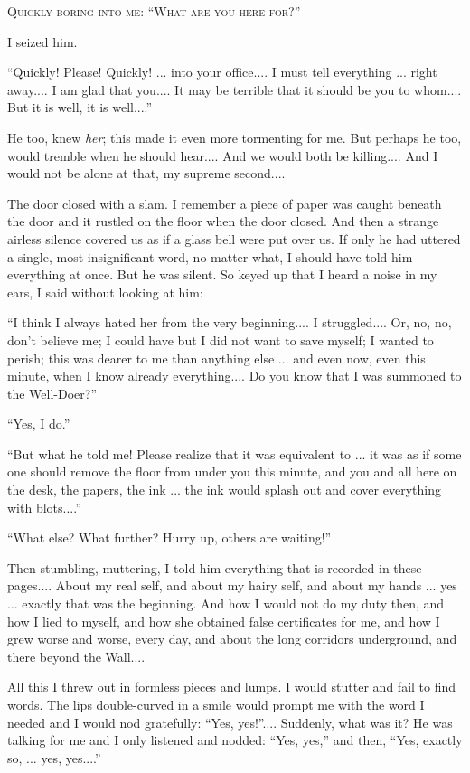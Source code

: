 \documentclass[11pt,openany]{book}
\begin{document}
\begin{center}\textsc{Quickly boring into me: ``What are you here for?''}\end{center}

I seized him.

``Quickly! Please! Quickly! ... into your office.... I must tell everything ... right away.... I am glad that you.... It may be terrible that it should be you to whom.... But it is well, it is well....''

He too, knew \emph{her}; this made it even more tormenting for me. But perhaps he too, would tremble when he should hear.... And we would both be killing.... And I would not be alone at that, my supreme second....

The door closed with a slam. I remember a piece of paper was caught beneath the door and it rustled on the floor when the door closed. And then a strange airless silence covered us as if a glass bell were put over us. If only he had uttered a single, most insignificant word, no matter what, I should have told him everything at once. But he was silent. So keyed up that I heard a noise in my ears, I said without looking at him:

``I think I always hated her from the very beginning.... I struggled.... Or, no, no, don't believe me; I could have but I did not want to save myself; I wanted to perish; this was dearer to me than anything else ... and even now, even this minute, when I know already everything.... Do you know that I was summoned to the Well-Doer?''

``Yes, I do.''

``But what he told me! Please realize that it was equivalent to ... it was as if some one should remove the floor from under you this minute, and you and all here on the desk, the papers, the ink ... the ink would splash out and cover everything with blots....''

``What else? What further? Hurry up, others are waiting!''

Then stumbling, muttering, I told him everything that is recorded in these pages.... About my real self, and about my hairy self, and about my hands ... yes ... exactly that was the beginning. And how I would not do my duty then, and how I lied to myself, and how she obtained false certificates for me, and how I grew worse and worse, every day, and about the long corridors underground, and there beyond the Wall....

All this I threw out in formless pieces and lumps. I would stutter and fail to find words. The lips double-curved in a smile would prompt me with the word I needed and I would nod gratefully: ``Yes, yes!''.... Suddenly, what was it? He was talking for me and I only listened and nodded: ``Yes, yes,'' and then, ``Yes, exactly so, ... yes, yes....''
\end{document}
